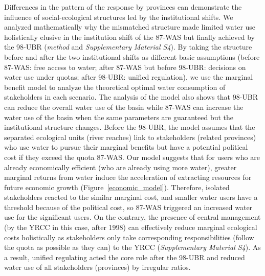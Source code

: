 \label{discussion-2}
Differences in the pattern of the response by provinces can demonstrate the influence of social-ecological structures led by the institutional shifts.
We analyzed mathematically why the mismatched structure made limited water use holistically elusive in the institution shift of the 87-WAS but finally achieved by the 98-UBR (\textit{method} and \textit{Supplementary Material S4}).
By taking the structure before and after the two institutional shifts as different basic assumptions (before 87-WAS: free access to water; after 87-WAS but before 98-UBR: decisions on water use under quotas; after 98-UBR: unified regulation), we use the marginal benefit model to analyze the theoretical optimal water consumption of stakeholders in each scenario.
The analysis of the model also shows that 98-UBR can reduce the overall water use of the basin while 87-WAS can increase the water use of the basin when the same parameters are guaranteed but the institutional structure changes.
Before the 98-UBR, the model assumes that the separated ecological units (river reaches) link to stakeholders (related provinces) who use water to pursue their marginal benefits but have a potential political cost if they exceed the quota 87-WAS.
Our model suggests that for users who are already economically efficient (who are already using more water), greater marginal returns from water induce the acceleration of extracting resources for future economic growth (Figure~\ref{economic_model}).
Therefore, isolated stakeholders reacted to the similar marginal cost, and smaller water users have a threshold because of the political cost, so 87-WAS triggered an increased water use for the significant users.
On the contrary, the presence of central management (by the YRCC in this case, after 1998) can effectively reduce marginal ecological costs holistically as stakeholders only take corresponding responsibilities (follow the quota as possible as they can) to the YRCC (\textit{Supplementary Material S4}).
As a result, unified regulating acted the core role after the 98-UBR and reduced water use of all stakeholders (provinces) by irregular ratios.

